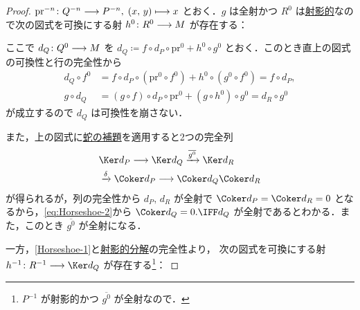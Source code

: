 \documentclass[algtopo_main]{subfiles}
\begin{document}
\begin{proof}
    $\mathrm{pr}^{-n} \colon Q^{-n} \longrightarrow P^{-n},\; (x,\, y) \longmapsto x$ とおく．$g$ は全射かつ $R^0$ は\hyperref[def:proj-mod]{射影的}なので次の図式を可換にする射 $h^0 \colon R^0 \longrightarrow M$ が存在する：
    \begin{figure}[H]
        \centering
    \end{figure}%
    ここで $d_Q \colon Q^0 \longrightarrow M$ を $d_Q \coloneqq f \circ d_P \circ \mathrm{pr}^0 + h^0 \circ g^0$ とおく．このとき直上の図式の可換性と行の完全性から
    \begin{align}
        d_Q \circ f^0 &= f \circ d_P \circ (\mathrm{pr}^0 \circ f^0) + h^0 \circ (g^0 \circ f^0) = f \circ d_P, \\
        g \circ d_Q &= (g \circ f) \circ d_P \circ \mathrm{pr}^0 + (g \circ h^0) \circ g^0 = d_R \circ g^0
    \end{align}
    が成立するので $d_Q$ は可換性を崩さない．
    
    また，上の図式に\hyperref[thm:snake]{蛇の補題}を適用すると2つの完全列
    \begin{align}
        &\Ker d_P \lto \Ker d_Q \xrightarrow{\overline{g^0}} \Ker d_R \label{eq:Horseshoe-1}\\
        &\xrightarrow{\delta}\Coker d_P \lto \Coker d_Q \Coker d_R \label{eq:Horseshoe-2}
    \end{align}
    が得られるが，列の完全性から $d_P,\, d_R$ が全射で $\Coker d_P = \Coker d_R = 0$ となるから，\eqref{eq:Horseshoe-2}から
    $\Coker d_Q = 0. \IFF d_Q$ が全射であるとわかる．また，このとき $\overline{g^0}$ が全射になる．

    一方，\eqref{Horseshoe-1}と\hyperref[def:projective-resolution]{射影的分解}の完全性より，
    次の図式を可換にする射 $h^{-1} \colon R^{-1} \lto \Ker d_Q$ が存在する\footnote{$P^{-1}$ が射影的かつ $\overline{g^0}$ が全射なので．}：


\end{proof}
\end{document}

